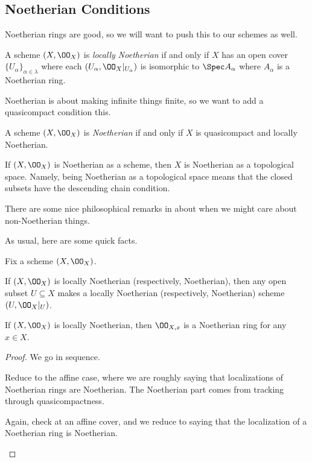 \documentclass[../notes.tex]{subfiles}
\begin{document}
\subsection{Noetherian Conditions}
Noetherian rings are good, so we will want to push this to our schemes as well.
\begin{definition}
	A scheme $(X,\OO_X)$ is \textit{locally Noetherian} if and only if $X$ has an open cover $\{U_\alpha\}_{\alpha\in\lambda}$ where each $(U_\alpha,\OO_X|_{U_\alpha})$ is isomorphic to $\Spec A_\alpha$ where $A_\alpha$ is a Noetherian ring.
\end{definition}
Noetherian is about making infinite things finite, so we want to add a quasicompact condition this.
\begin{definition}[Noetherian]
	A scheme $(X,\OO_X)$ is \textit{Noetherian} if and only if $X$ is quasicompact and locally Noetherian.
\end{definition}
\begin{remark}
	If $(X,\OO_X)$ is Noetherian as a scheme, then $X$ is Noetherian as a topological space. Namely, being Noetherian as a topological space means that the closed subsets have the descending chain condition.
\end{remark}
\begin{remark}
	There are some nice philosophical remarks in \cite[Section~3.6.21]{rising-sea} about when we might care about non-Noetherian things.
\end{remark}
As usual, here are some quick facts.
\begin{lemma}
	Fix a scheme $(X,\OO_X)$.
	\begin{listalph}
		\item If $(X,\OO_X)$ is locally Noetherian (respectively, Noetherian), then any open subset $U\subseteq X$ makes a locally Noetherian (respectively, Noetherian) scheme $(U,\OO_X|_U)$.
		\item If $(X,\OO_X)$ is locally Noetherian, then $\OO_{X,x}$ is a Noetherian ring for any $x\in X$.
	\end{listalph}
\end{lemma}
\begin{proof}
	We go in sequence.
	\begin{listalph}
		\item Reduce to the affine case, where we are roughly saying that localizations of Noetherian rings are Noetherian. The Noetherian part comes from tracking through quasicompactness.
		\item Again, check at an affine cover, and we reduce to saying that the localization of a Noetherian ring is Noetherian.
		\qedhere
	\end{listalph}
\end{proof}
\end{document}
